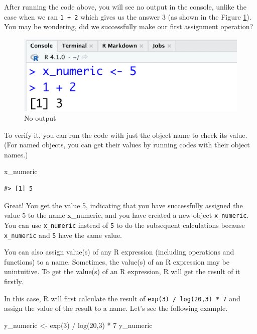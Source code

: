 \documentclass[
]{book}
\newenvironment{Shaded}{\begin{snugshade}}{\end{snugshade}}
\newcommand{\DecValTok}[1]{\textcolor[rgb]{0.00,0.00,0.81}{#1}}
\newcommand{\FunctionTok}[1]{\textcolor[rgb]{0.00,0.00,0.00}{#1}}
\newcommand{\NormalTok}[1]{#1}
\newcommand{\OtherTok}[1]{\textcolor[rgb]{0.56,0.35,0.01}{#1}}
\newcommand{\SpecialCharTok}[1]{\textcolor[rgb]{0.00,0.00,0.00}{#1}}
\begin{document}
After running the code above, you will see no output in the console, unlike the case when we ran \texttt{1\ +\ 2} which gives us the answer 3 (as shown in the Figure \ref{fig:noa}). You may be wondering, did we successfully make our first assignment operation?

\begin{figure}

{\centering \includegraphics[width=0.7\linewidth]{pics/2noa} 

}

\caption{No output}\label{fig:noa}
\end{figure}

To verify it, you can run the code with just the object name to check its value. (For named objects, you can get their values by running codes with their object names.)

\begin{Shaded}
\begin{Highlighting}[]
\NormalTok{x\_numeric}
\end{Highlighting}
\end{Shaded}

\begin{verbatim}
#> [1] 5
\end{verbatim}

Great! You get the value 5, indicating that you have successfully assigned the value 5 to the name x\_numeric, and you have created a new object \texttt{x\_numeric}. You can use \texttt{x\_numeric} instead of \texttt{5} to do the subsequent calculations because \texttt{x\_numeric} and \texttt{5} have the same value.

You can also assign value(s) of any R expression (including operations and functions) to a name. Sometimes, the value(s) of an R expression may be unintuitive. To get the value(s) of an R expression, R will get the result of it firstly.

In this case, R will first calculate the result of \texttt{exp(3)\ /\ log(20,3)\ *\ 7} and assign the value of the result to a name. Let's see the following example.

\begin{Shaded}
\begin{Highlighting}[]
\NormalTok{y\_numeric }\OtherTok{\textless{}{-}} \FunctionTok{exp}\NormalTok{(}\DecValTok{3}\NormalTok{) }\SpecialCharTok{/} \FunctionTok{log}\NormalTok{(}\DecValTok{20}\NormalTok{,}\DecValTok{3}\NormalTok{) }\SpecialCharTok{*} \DecValTok{7}
\NormalTok{y\_numeric}
\end{Highlighting}
\end{Shaded}
\end{document}
